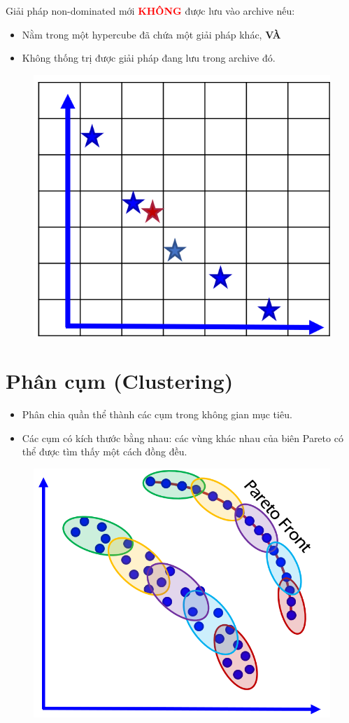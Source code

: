 \documentclass{book}
\begin{document}
Giải pháp non-dominated mới \textcolor{red}{\textbf{KHÔNG}} được lưu vào archive nếu:
\begin{itemize}
    \item Nằm trong một hypercube đã chứa một giải pháp khác, \textbf{VÀ}
    \item Không thống trị được giải pháp đang lưu trong archive đó.
\end{itemize}

\begin{figure}[H]
    \centering
    \includegraphics[width=0.5\linewidth]{images/GA-7-8_65.png}
\end{figure}

\section*{Phân cụm (Clustering)}

\begin{itemize}
    \item Phân chia quần thể thành các cụm trong không gian mục tiêu.
    \item Các cụm có kích thước bằng nhau: các vùng khác nhau của biên Pareto có thể được tìm thấy một cách đồng đều.
\end{itemize}

\begin{figure}[H]
    \centering
    \includegraphics[width=0.5\linewidth]{images/GA-7-8_66.png}
\end{figure}
\end{document}
